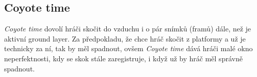 \subsection{Coyote time}

\textit{Coyote time} dovolí hráči skočit do vzduchu i o pár snímků (framů) dále, než je aktivní ground layer. Za předpokladu, že chce hráč skočit z platformy a už je technicky za ní, tak by měl spadnout, ovšem \textit{Coyote time} dává hráči malé okno neperfektnosti, kdy se skok stále zaregistruje, i když už by hráč měl správně spadnout.